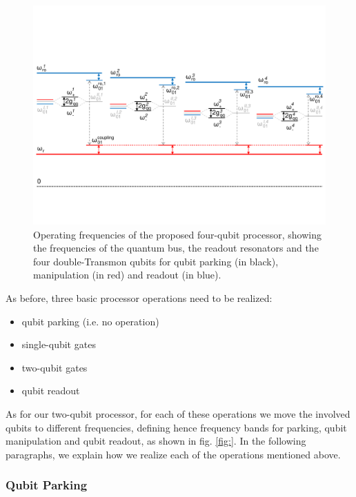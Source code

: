 \begin{figure}[ht!]
	\centering
	\includegraphics[width=\textwidth]{./material/figures/scalable-architecture/qubit_architecture_energy_levels}
	\caption[]{Operating frequencies of the proposed four-qubit processor, showing the frequencies of the quantum bus, the readout resonators and the four double-Transmon qubits for qubit parking (in black), manipulation (in red) and readout (in blue).}
	\label{fig:scalable_architecture_energy_levels}
\end{figure}

As before, three basic processor operations need to be realized:

\begin{itemize}
\item qubit parking (i.e. no operation)
\item single-qubit gates
\item two-qubit gates
\item qubit readout
\end{itemize}

As for our two-qubit processor, for each of these operations we move the involved qubits to different frequencies, defining hence frequency bands for parking, qubit manipulation and qubit readout, as shown in fig. \ref{fig:}. In the following paragraphs, we explain how we realize each of the operations mentioned above.

\subsubsection{Qubit Parking}

